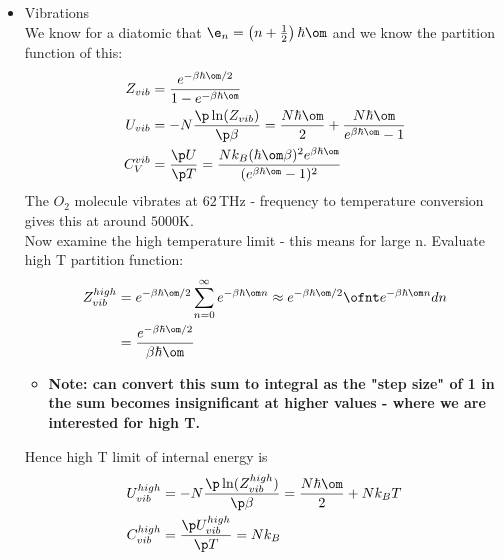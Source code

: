 \documentclass[a4paper, 11pt, normalem]{report}
\begin{document}
\chapter{}

\begin{example}[Ctd]
    \begin{itemize}
        \item Vibrations \\
            We know for a diatomic that $\e_n = \left(n+\frac{1}{2}\right)\hbar\om$ and we know the partition function of this:
            \begin{align}
                Z_{vib} &= \frac{e^{-\beta\hbar\om/2}}{1 - e^{-\beta\hbar\om}} \\
                U_{vib} &= -N\frac{\p\ln(Z_{vib})}{\p\beta} = \frac{N\hbar\om}{2} + \frac{N\hbar\om}{e^{\beta\hbar\om} - 1} \\
                C_V^{vib} &= \frac{\p U}{\p T} = \frac{Nk_B(\hbar\om\beta)^2e^{\beta\hbar\om}}{(e^{\beta\hbar\om} - 1)^2}
            \end{align}
            The $O_2$ molecule vibrates at $62\,$THz - frequency to temperature conversion gives this at around $5000$K. \\
            Now examine the high temperature limit - this means for large n. 
            Evaluate high T partition function:
            \begin{align}
                Z^{high}_{vib} &= e^{-\beta\hbar\om/2}\sum_{n=0}^\infty e^{-\beta\hbar\om n} \approx e^{-\beta\hbar\om/2} \ofnt e^{-\beta\hbar\om n}dn \\ 
                        &= \frac{e^{-\beta\hbar\om/2}}{\beta\hbar\om}
            \end{align}
            \begin{itemize}
                \item \textbf{Note: can convert this sum to integral as the "step size" of 1 in the sum becomes insignificant at higher values - where we are interested for high T.} 
            \end{itemize} 
            \vspace{10pt}
            Hence high T limit of internal energy is 
            \begin{align}
                U^{high}_{vib} &= -N\frac{\p\ln(Z^{high}_{vib})}{\p\beta} = \frac{N\hbar\om}{2} + Nk_BT \\
                C^{high}_{vib} &= \frac{\p U_{vib}^{high}}{\p T} = Nk_B
            \end{align}

\end{itemize}
\end{example}
\end{document}
